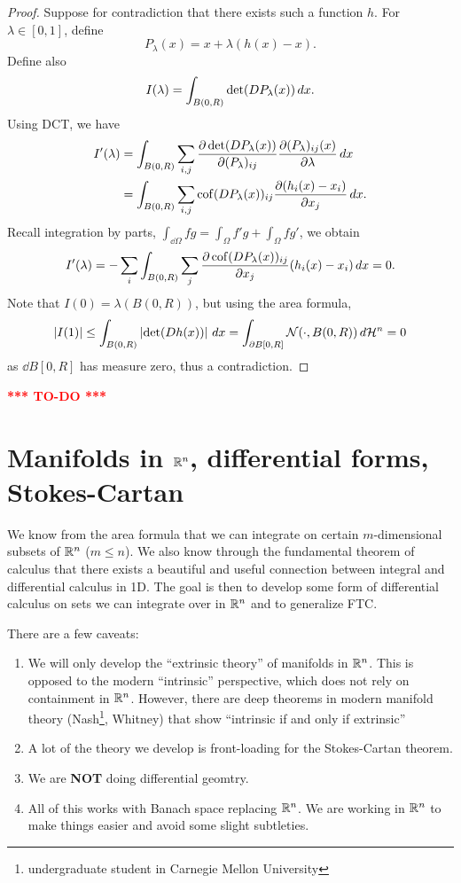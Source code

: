 \documentclass[a4paper]{article}
\newcommand{\TODO}{\textcolor{red}{\textbf{*** TO-DO ***}}}
\begin{document}
\begin{proof}
  Suppose for contradiction that there exists such a function $h$. For
  $\lambda \in [0, 1]$, define
  \[
    P_\lambda (x) = x + \lambda (h(x) - x) .
  \]
  Define also
  \[
    I(\lambda)  = \int_{B(0, R)} \det (D P_\lambda (x)) \, d x.
  \]
  Using DCT, we have
  \begin{align*}
    I'(\lambda)
     & = \int_{B(0, R)} \sum_{i, j} \frac{\partial \det(D P_\lambda(x))}{\partial (P_\lambda)_{ij}}
    \frac{\partial (P_\lambda)_{ij} (x)}{\partial \lambda} \, d x                                     \\
     & = \int_{B(0, R)} \sum_{i, j} \operatorname{cof} (D P_\lambda(x))_{ij}
    \frac{\partial (h_i(x) - x_i)}{\partial x_j} \, d x.
  \end{align*}
  Recall integration by parts, $\int_{\dd \Omega} f g = \int_\Omega
    f' g + \int_\Omega f g'$, we obtain
  \[
    I'(\lambda) = - \sum_i \int_{B(0, R)}
    \sum_j \frac{\partial \operatorname{cof} (D P_\lambda(x))_{ij}}{\partial x_j} (h_i(x) - x_i)
    \, d x = 0.
  \]
  Note that $I(0) = \lambda(B(0, R))$, but using the area formula,
  \[
    \left\lvert I(1)\right\rvert
    \leq \int_{B(0, R)} \left\lvert \det (Dh(x))\right\rvert \, d x
    = \int_{\partial B[0, R]} \mathcal{N}(\cdot, B(0, R)) \, d \mathcal{H}^n
    = 0
  \]
  as $\dd B[0, R]$ has measure zero, thus a contradiction.
\end{proof}

\TODO

\section{Manifolds in $\mathbb{R}^n$, differential forms, Stokes-Cartan}

We know from the area formula that we can integrate on certain
$m$-dimensional subsets of $\mathbb{R}^n$ ($m \leq n$). We also know through the
fundamental theorem of calculus that there exists a beautiful and useful
connection between integral and differential calculus in 1D. The goal is
then to develop some form of differential calculus on sets we can
integrate over in $\mathbb{R}^n$ and to generalize FTC.

There are a few caveats:
\begin{enumerate}
  \item We will only develop the ``extrinsic theory'' of manifolds in
        $\mathbb{R}^n$. This is opposed to the modern ``intrinsic'' perspective,
        which does not rely on containment in $\mathbb{R}^n$. However, there are
        deep theorems in modern manifold theory
        (Nash\footnote{undergraduate student in Carnegie Mellon
        University}, Whitney) that show ``intrinsic if and only if
        extrinsic''

  \item A lot of the theory we develop is front-loading for the
        Stokes-Cartan theorem.

  \item We are \textbf{NOT} doing differential geomtry.

  \item All of this works with Banach space replacing $\mathbb{R}^n$. We are
        working in $\mathbb{R}^n$ to make things easier and avoid some slight
        subtleties.
\end{enumerate}
\end{document}
